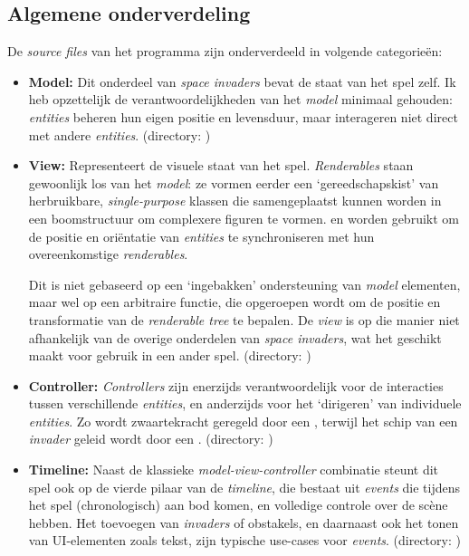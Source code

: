 \documentclass[10pt,a4paper]{article}
\begin{document}
\subsection{Algemene onderverdeling}
De \emph{source files} van het programma zijn onderverdeeld in volgende 
categorie\"en:
\begin{itemize}
\item \textbf{Model:} Dit onderdeel van \emph{space invaders} bevat de staat van het 
spel zelf. Ik heb opzettelijk de verantwoordelijkheden van het \emph{model} minimaal 
gehouden: \emph{entities} beheren hun eigen positie en levensduur, maar interageren 
niet direct met andere \emph{entities}. 
(directory: )

\item \textbf{View:} Representeert de visuele staat van het spel. \emph{Renderables} 
staan gewoonlijk los van het \emph{model}: ze vormen eerder een
`gereedschapskist' van herbruikbare, \emph{single-purpose} klassen die samengeplaatst 
kunnen worden in een boomstructuur om complexere figuren te vormen.  en  worden gebruikt om 
de positie en ori\"entatie van \emph{entities} te synchroniseren met hun 
overeenkomstige \emph{renderables}. 

Dit is niet gebaseerd op een `ingebakken' 
ondersteuning van \emph{model} elementen, maar wel op een arbitraire 
functie, die opgeroepen wordt om de positie en transformatie van de \emph{renderable 
tree} te bepalen. De \emph{view} is op die manier niet afhankelijk van de overige
onderdelen van \emph{space invaders}, wat het geschikt maakt voor gebruik in 
een ander spel. 
(directory: )

\item \textbf{Controller:} \emph{Controllers} zijn enerzijds verantwoordelijk voor 
de interacties tussen verschillende \emph{entities}, en anderzijds voor het 
`dirigeren' van individuele \emph{entities}. Zo wordt zwaartekracht geregeld door
een , terwijl het schip van een \emph{invader} geleid wordt 
door een . 
(directory: )

\item \textbf{Timeline:} Naast de klassieke \emph{model-view-controller} 
combinatie steunt dit spel ook op de vierde pilaar van de \emph{timeline}, die 
bestaat uit \emph{events} die tijdens het spel (chronologisch) aan bod komen, en
volledige controle over de sc\`ene hebben. Het toevoegen van \emph{invaders} of 
obstakels, en daarnaast ook het tonen van UI-elementen zoals tekst, zijn
typische use-cases voor \emph{events}.
(directory: )


\end{itemize}
\end{document}
